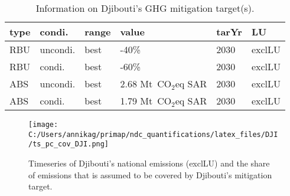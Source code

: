 \documentclass[12pt]{article}
\begin{document}
 \begin{table}[H]
 \centering
 \caption{Information on Djibouti's GHG mitigation target(s).}
 \label{tab:mitiTars}
 \begin{tabular}{l l l l l l }
 \bfseries type & \bfseries condi. & \bfseries range & \bfseries value & \bfseries tarYr & \bfseries LU \tabularnewline \hline
 RBU & uncondi. & best & -40\% & 2030 & exclLU \tabularnewline 
 RBU & condi. & best & -60\% & 2030 & exclLU \tabularnewline 
 ABS & uncondi. & best & 2.68 Mt~CO$_2$eq SAR & 2030 & exclLU \tabularnewline 
 ABS & condi. & best & 1.79 Mt~CO$_2$eq SAR & 2030 & exclLU \tabularnewline 
 \end{tabular}
 \end{table}

 \begin{figure}[H]
 \centering
 \texttt{[image: C:/Users/annikag/primap/ndc\_quantifications/latex\_files/DJI/ts\_pc\_cov\_DJI.png]}
 \caption{Timeseries of Djibouti's national emissions (exclLU) and the share of emissions that is assumed to be covered by Djibouti's mitigation target.}
 \label{fig:tsPcCov}
 \end{figure}
\end{document}
